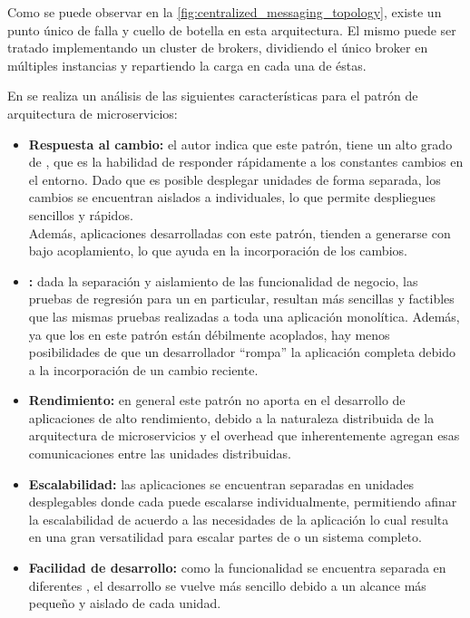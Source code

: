Como se puede observar en la \autoref{fig:centralized_messaging_topology}, existe un punto único de falla y cuello de botella en esta arquitectura. El mismo puede ser tratado implementando un cluster de brokers, dividiendo el único broker en múltiples instancias y repartiendo la carga en cada una de éstas.\cite[p.~31]{richards2015}

En \cite[p.~34]{richards2015} se realiza un análisis de las siguientes características para el patrón de arquitectura de microservicios:

\begin{itemize}
  \item \textbf{Respuesta al cambio:} el autor indica que este patrón, tiene un alto grado de , que es la habilidad de responder rápidamente a los constantes cambios en el entorno.  Dado que es posible desplegar unidades de forma separada, los cambios se encuentran aislados a  individuales, lo que permite despliegues sencillos y rápidos.\\
  Además, aplicaciones desarrolladas con este patrón, tienden a generarse con bajo acoplamiento, lo que ayuda en la incorporación de los cambios.

  \item \textbf{:} dada la separación y aislamiento de las funcionalidad de negocio, las pruebas de regresión para un  en particular, resultan más sencillas y factibles que las mismas pruebas realizadas a toda una aplicación monolítica.  Además, ya que los  en este patrón están débilmente acoplados, hay menos posibilidades de que un desarrollador ``rompa'' la aplicación completa debido a la incorporación de un cambio reciente.

  \item \textbf{Rendimiento:} en general este patrón no aporta en el desarrollo de aplicaciones de alto rendimiento, debido a la naturaleza distribuida de la arquitectura de microservicios y el overhead que inherentemente agregan esas comunicaciones entre las unidades distribuidas.

  \item \textbf{Escalabilidad:} las aplicaciones se encuentran separadas en unidades desplegables donde cada  puede escalarse individualmente, permitiendo afinar la escalabilidad de acuerdo a las necesidades de la aplicación lo cual resulta en una gran versatilidad para escalar partes de o un sistema completo.

  \item \textbf{Facilidad de desarrollo:} como la funcionalidad se encuentra separada en diferentes , el desarrollo se vuelve más sencillo debido a un alcance más pequeño y aislado de cada unidad.
\end{itemize}
